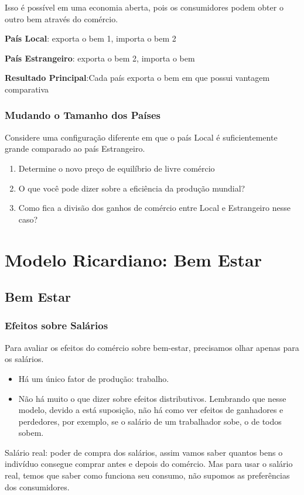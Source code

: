 \documentclass[a4paper,12pt]{article}[abntex2]
\begin{document}
Isso é possível em uma economia aberta, pois os consumidores podem obter o outro bem através do comércio.

\textbf{País Local}: exporta o bem 1, importa o bem 2

\textbf{País Estrangeiro}: exporta o bem 2, importa o bem 

\textbf{Resultado Principal}:Cada país exporta o bem em que possui vantagem comparativa

\subsubsection{\textbf{Mudando o Tamanho dos Países}}
Considere uma configuração diferente em que o país Local  é suficientemente grande comparado ao país Estrangeiro.\begin{enumerate}
    \item Determine o novo preço de equilíbrio de livre comércio
    \item O que você pode dizer sobre a eficiência da produção mundial?
    \item Como fica a divisão dos ganhos de comércio entre Local  e Estrangeiro  nesse caso?
\end{enumerate}

\newpage
\section{\textbf{Modelo Ricardiano: Bem Estar}}
\subsection{\textbf{Bem Estar}}
\subsubsection{\textbf{Efeitos sobre Salários}}
Para avaliar os efeitos do comércio sobre bem-estar, precisamos olhar apenas para os salários.\begin{itemize}
    \item Há um único fator de produção: trabalho. 
    \item Não há muito o que dizer sobre efeitos distributivos. Lembrando que nesse modelo, devido a está suposição, não há como ver efeitos de ganhadores e perdedores, por exemplo, se o salário de um trabalhador sobe, o de todos sobem.
\end{itemize}

Salário real: poder de compra dos salários, assim vamos saber quantos bens o indivíduo consegue comprar antes e depois do comércio. Mas para usar o salário real, temos que saber como funciona seu consumo, não supomos as preferências dos consumidores.
\end{document}
